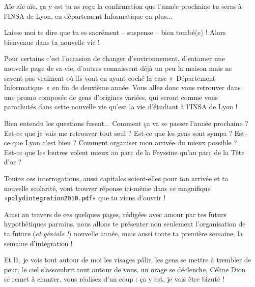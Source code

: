 Aïe aïe aïe, ça y est tu as reçu la confirmation que l'année prochaine tu seras à l'INSA de Lyon, en département Informatique en plus...

\vspace{1em}

Laisse moi te dire que tu es sacrément -- suspense -- bien tombé(e) ! Alors
bienvenue dans ta nouvelle vie !


\vspace{1em}

Pour certains c'est l'occasion de changer d'environnement, d'entamer une
nouvelle page de sa vie,  d'autres connaissent déjà un peu la maison mais
ne savent pas vraiment où ils vont en ayant coché la case «~Département
Informatique~» en fin de deuxième année. Vous allez donc vous retrouver dans
une promo composée de gens d'origines variées, qui seront comme vous parachutés
dans cette nouvelle vie qu'est la vie d'étudiant à l'INSA de Lyon !


\vspace{1em}

Bien entendu les questions fusent... Comment ça va se passer l'année
prochaine ? Est-ce que je vais me retrouver tout seul ?  Est-ce que les gens
sont sympa ? Est-ce que  Lyon c'est bien ? Comment organiser mon arrivée du
mieux possible ? Est-ce que les loutres volent mieux au parc de la Feyssine
qu'au parc de la Tête d'or ?


\vspace{1em}

Toutes ces interrogations, aussi capitales soient-elles pour ton arrivée et ta
nouvelle scolarité, vont trouver réponse ici-même dans ce magnifique
«\texttt{polydintegration2010.pdf}» que tu viens d'ouvrir ! 


\vspace{1em}

Ainsi au travers de ces quelques pages, rédigées avec amour par tes futurs
hypothétiques parrains, nous allons te présenter non seulement l'organisation
de ta future (\emph{et géniale !}) nouvelle année, mais aussi toute ta première
semaine, la semaine d'intégration  !


\vspace{1em}

Et là, je vois tout autour de moi les visages pâlir, les gens se mettre à
trembler de peur, le ciel s'assombrit tout autour de vous, un orage se
déclenche, Céline Dion se remet à chanter, vous réalisez d'un coup : ça y est,
je vais être bizuté !


\vspace{1em}

